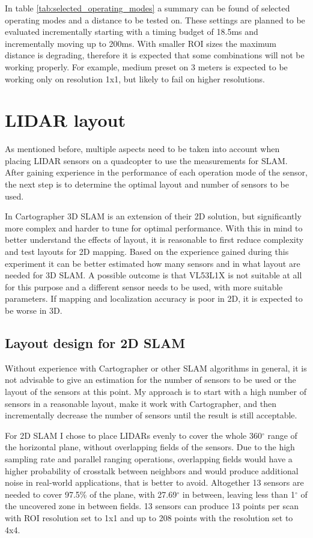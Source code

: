 In table \ref{tab:selected_operating_modes} a summary can be found of selected operating modes and a
distance to be tested on. These settings are planned to be evaluated incrementally starting with a
timing budget of 18.5ms and incrementally moving up to 200ms. With smaller ROI sizes the maximum
distance is degrading, therefore it is expected that some combinations will not be working
properly. For example, medium preset on 3 meters is expected to be working only on resolution 1x1,
but likely to fail on higher resolutions.








\section{LIDAR layout} \label{sect:lidar_layout_plan}
As mentioned before, multiple aspects need to be taken into account when placing LIDAR sensors on a
quadcopter to use the measurements for SLAM. After gaining experience in the performance
of each operation mode of the sensor, the next step is to determine the optimal layout and number of sensors
to be used.

In Cartographer 3D SLAM is an extension of their 2D solution, but significantly more complex and
harder to tune for optimal performance. With this in mind to better understand the effects of
layout, it is reasonable to first reduce complexity and test layouts for 2D mapping. Based on
the experience gained during this experiment it can be better estimated how many sensors and in what layout
are needed for 3D SLAM. A possible outcome is that VL53L1X is not suitable at all for this purpose and
a different sensor needs to be used, with more suitable parameters. If mapping and localization accuracy
is poor in 2D, it is expected to be worse in 3D.

\subsection{Layout design for 2D SLAM}
Without experience with Cartographer or other SLAM algorithms in general, it is not advisable to give an
estimation for the number of sensors to be used or the layout of the sensors at this point. My approach
is to start with a high number of sensors in a reasonable layout, make it work with Cartographer, and then
incrementally decrease the number of sensors until the result is still acceptable.

For 2D SLAM I chose to place LIDARs evenly to cover the whole 360$^{\circ}$ range of the horizontal plane,
without overlapping fields of the sensors. Due to the high sampling rate and parallel ranging operations,
overlapping fields would have a higher probability of crosstalk between neighbors and would produce
additional noise in real-world applications, that is better to avoid. Altogether 13 sensors are needed to
cover 97.5\% of the plane, with 27.69$^{\circ}$ in between, leaving less than 1$^{\circ}$ of the uncovered zone in
between fields. 13 sensors can produce 13 points per scan with ROI resolution set to 1x1 and up to 208
points with the resolution set to 4x4.

